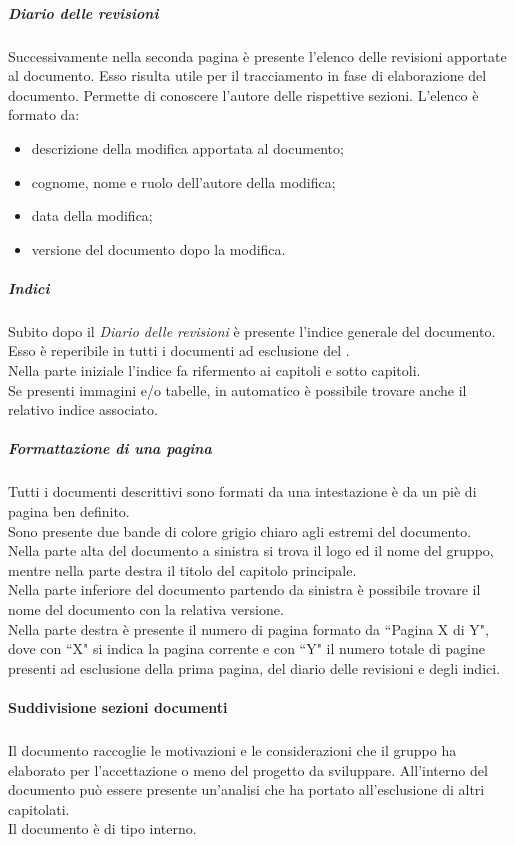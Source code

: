 				\subparagraph{Diario delle revisioni}
				Successivamente nella seconda pagina è presente l'elenco delle revisioni apportate al documento. Esso risulta utile per il tracciamento in fase di elaborazione del documento. Permette di conoscere l'autore delle rispettive sezioni. L'elenco è formato da:
				\begin{itemize}
					\item descrizione della modifica apportata al documento;
					\item cognome, nome e ruolo dell'autore della modifica;
					\item data della modifica;
					\item versione del documento dopo la modifica.
				\end{itemize}

				\subparagraph{Indici}
				Subito dopo il \emph{Diario delle revisioni} è presente l'indice generale del documento. Esso è reperibile in tutti i documenti ad esclusione del \docGlossary.\\
				Nella parte iniziale l'indice fa rifermento ai capitoli e sotto capitoli.\\
				Se presenti immagini e/o tabelle, in automatico è possibile trovare anche il relativo indice associato.
			
				\subparagraph{Formattazione di una pagina}
				Tutti i documenti descrittivi sono formati da una intestazione è da un piè di pagina ben definito.\\
				Sono presente due bande di colore grigio chiaro agli estremi del documento.\\
				Nella parte alta del documento a sinistra si trova il logo ed il nome del gruppo, mentre nella parte destra il titolo del capitolo principale.\\
				Nella parte inferiore del documento partendo da sinistra è possibile trovare il nome del documento con la relativa versione.\\
				Nella parte destra è presente il numero di pagina formato da ``Pagina X di Y", dove con ``X" si indica la pagina corrente e con ``Y" il numero totale di pagine presenti ad esclusione della prima pagina, del diario delle revisioni e degli indici.

			\paragraph{Suddivisione sezioni documenti}

				\subparagraph{\docNameSdF} Il documento raccoglie le motivazioni e le considerazioni che il gruppo ha elaborato per l'accettazione o meno del progetto da sviluppare. All'interno del documento può essere presente un'analisi che ha portato all'esclusione di altri capitolati.\\
				Il documento è di tipo interno.

